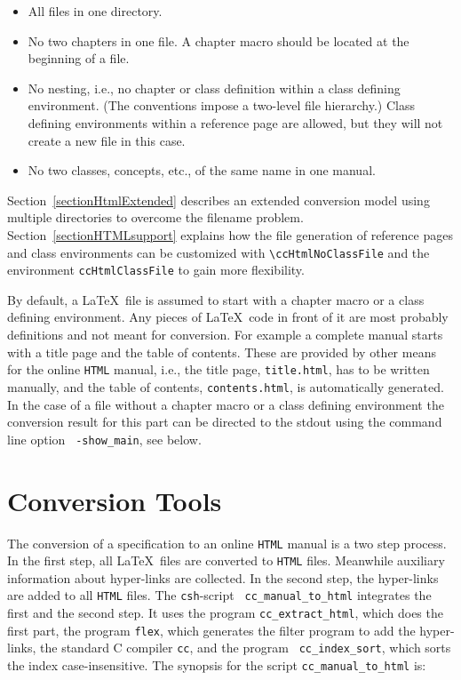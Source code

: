 \documentclass[11pt]{article}
\newcommand{\Dindex}[1]{#1\index{#1}}
\begin{document}
\begin{itemize}
  \item
    All files in one directory.
  \item
    No two chapters in one file. A chapter macro should be located at
    the beginning of a file.
  \item
    No nesting, i.e., no chapter or class definition within a class
    defining environment. (The conventions impose a two-level file
    hierarchy.) Class defining environments within a reference page
    are allowed, but they will not create a new file in this case.
  \item
    No two classes, concepts, etc., of the same name in one manual.
\end{itemize}

Section~\ref{sectionHtmlExtended} describes an extended conversion
model using multiple directories to overcome the filename problem.
Section~\ref{sectionHTMLsupport} explains how the file generation of
reference pages and class environments can be customized with
\verb+\ccHtmlNoClassFile+ and the environment {\tt ccHtmlClassFile} to
gain more flexibility.

By default, a \LaTeX\ file is assumed to start with a chapter macro or
a class defining environment. Any pieces of \LaTeX\ code in front of
it are most probably definitions and not meant for conversion. For
example a complete manual starts with a title page and the table of
contents. These are provided by other means for the online {\tt HTML}
manual, i.e., the title page, {\tt title.html}, has to be written
manually, and the table of contents, {\tt contents.html}, is
automatically generated.  In the case of a file without a chapter
macro or a class defining environment the conversion result for this
part can be directed to the stdout using the command line option {\tt
  -show\_main}, see below.


\section{Conversion Tools}

The conversion of a specification to an online {\tt HTML} manual is a
two step process. In the first step, all \LaTeX\ files are converted
to {\tt HTML} files. Meanwhile auxiliary information about
\Dindex{hyper-links} are collected.  In the second step, the hyper-links
are added to all {\tt HTML} files.  The {\tt csh}-script {\tt
  cc\_manual\_to\_html} integrates the first and the second step. It
uses the program {\tt cc\_extract\_html}, which does the first part,
the program {\tt flex}, which generates the filter program to add the
hyper-links, the standard C compiler {\tt cc}, and the program {\tt
  cc\_index\_sort}, which sorts the index case-insensitive. The
synopsis for the script {\tt cc\_manual\_to\_html} is:
\end{document}
